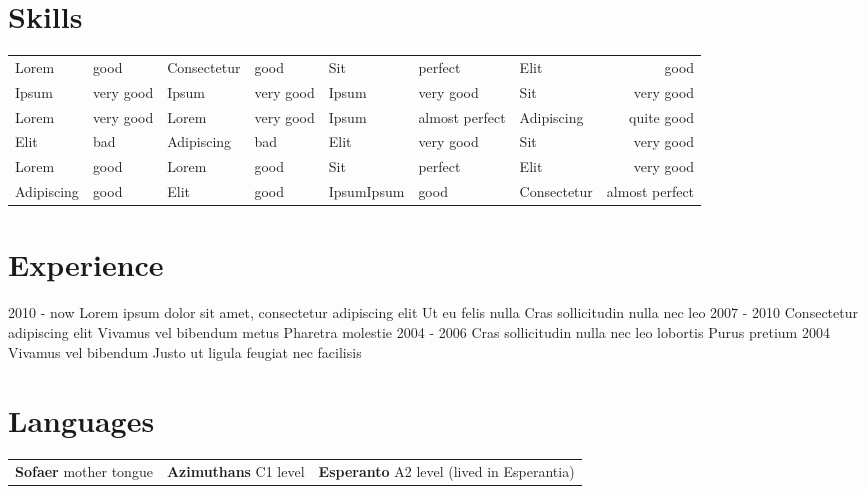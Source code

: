 \documentclass[]{viccuad-cv}
\begin{document}
\framebreak


\section{Skills}
\providecommand{\tabularnewline}{\\}
    \begin{tabularx}{\linewidth}{XX| XX| XX| Xr}
       Lorem       &  good & Consectetur       &  good & Sit      &  perfect &  Elit   &  good\tabularnewline
       Ipsum    &  very good & Ipsum    &  very good & Ipsum      &  very good & Sit            &  very good\tabularnewline
       Lorem     &  very good & Lorem     &  very good & Ipsum      &  almost perfect & Adipiscing               &  quite good\tabularnewline
       Elit  &  bad & Adipiscing  &  bad & Elit     &  very good & Sit       &  very good\tabularnewline
       Lorem &  good & Lorem &  good & Sit         &  perfect & Elit          &  very good\tabularnewline
       Adipiscing  &  good & Elit &  good & IpsumIpsum &  good & Consectetur                  &  almost perfect\tabularnewline
    \end{tabularx}

\framebreak



\section{Experience}
    \begin{entrylistdated}
      \entrydated
        {2010 - now}
        {Lorem ipsum dolor sit amet, consectetur adipiscing elit}
        {Ut eu felis nulla}
        {Cras sollicitudin nulla nec leo}
      \entrydated
        {2007 - 2010}
        {Consectetur adipiscing elit}
        {Vivamus vel bibendum metus}
        {Pharetra molestie}
      \entrydated
        {2004 - 2006}
        {Cras sollicitudin nulla nec leo lobortis}
        {}
        {Purus pretium} 
      \entrydated
        {2004}
        {Vivamus vel bibendum}
        {Justo ut ligula feugiat nec facilisis}
        {}
    \end{entrylistdated}



\section{Languages}
    \begin{tabularx}{\linewidth}{XXr}
        \textbf{Sofaer} mother tongue & \textbf{Azimuthans} C1 level & \textbf{Esperanto} A2 level (lived in Esperantia) \tabularnewline
    \end{tabularx}
 
\end{document}
